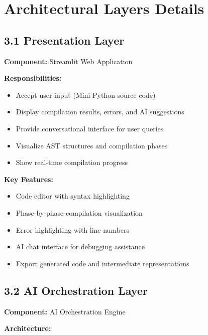 \documentclass[a4paper,11pt]{article}
\begin{document}
\section{Architectural Layers Details}

\subsection{3.1 Presentation Layer}

\textbf{Component:} Streamlit Web Application

\textbf{Responsibilities:}
\begin{itemize}[leftmargin=*]
    \item Accept user input (Mini-Python source code)
    \item Display compilation results, errors, and AI suggestions
    \item Provide conversational interface for user queries
    \item Visualize AST structures and compilation phases
    \item Show real-time compilation progress
\end{itemize}

\textbf{Key Features:}
\begin{itemize}[leftmargin=*]
    \item Code editor with syntax highlighting
    \item Phase-by-phase compilation visualization
    \item Error highlighting with line numbers
    \item AI chat interface for debugging assistance
    \item Export generated code and intermediate representations
\end{itemize}

\subsection{3.2 AI Orchestration Layer}

\textbf{Component:} AI Orchestration Engine

\textbf{Architecture:}
\end{document}
